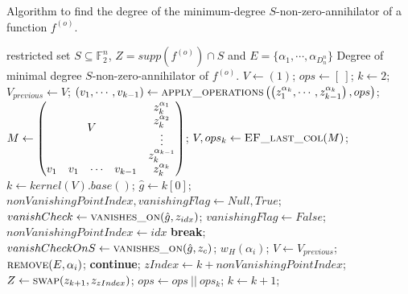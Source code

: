 \documentclass[11pt]{llncs}
\begin{document}
\begin{algorithm}
	\caption{Algorithm to find the degree of the minimum-degree $S$-non-zero-annihilator of a function $f^{(o)}$.}\label{alg:MinDegreeSnonZeroAnnihilatorIterative}
	\begin{algorithmic}[1]
		\Require restricted set $S\subseteq \mathbb{F}_2^n$, $Z = supp\left(f^{(o)}\right) \cap S$ and $E = \{\alpha_1, \cdots, \alpha_{D_n^n}\}$
		\Ensure Degree of minimal degree $S$-non-zero-annihilator of $f^{(o)}$.
		\State $V\gets (1)$;
		\State $ops \gets [\ ]$;
		\State $k \gets 2$;
		\State $V_{previous} \gets V$;
		\State $\left(v_1, \cdots, v_{k-1}\right) \gets \mbox{\textsc{apply\_operations}}\left(\left(z_1^{\alpha_k}, \cdots, z_{k-1}^{\alpha_k}\right), ops\right)$\footnotemark;
		\State  $M \gets \begin{pmatrix}
		\multicolumn{4}{c}{\multirow{4}{*}{$V$}} & z_k^{\alpha_1}\\
		& & & & z_k^{\alpha_2}\\
		& & & & \vdots\\
		& & & & z_k^{\alpha_{k-1}}\\
		v_1 & v_1& \cdots & v_{k-1} & z_k^{\alpha_k}
		\end{pmatrix}$;
		\State $V, ops_k\gets \mbox{\textsc{EF\_last\_col}}(M)$\footnotemark;
		\State $k \gets kernel\left(V\right).base()$;
		\State $\hat{g} \gets k[0]$;
		\State $nonVanishingPointIndex, vanishingFlag \gets Null, True$;
		\State $vanishCheck \gets \mbox{\textsc{vanishes\_on}}(\hat{g}, z_{idx})$\footnotemark;
		\State $vanishingFlag \gets False$;
        \State $nonVanishingPointIndex \gets idx$
		\State \textbf{break};
		\EndIf
        \EndFor
		\State $vanishCheckOnS \gets \mbox{\textsc{vanishes\_on}}(\hat{g}, z_c)$;
		\State \Return $w_H\left(\alpha_i\right)$;
		\EndIf
		\EndFor
		\State $V\gets V_{previous}$;
		\State $\mbox{\textsc{remove}}(E, \alpha_i)$;
		\State \textbf{continue}; 
        \Else
		\State $zIndex \gets k+nonVanishingPointIndex$;
		\State $Z \gets \mbox{\textsc{swap}}(z_{k+1}, z_{zIndex})$\footnotemark;
		\EndIf
        \State $ops\gets ops\ ||\ ops_k$;
		\State $k\gets k+1$;
		\EndIf
		\EndWhile
		\State {}
	\end{algorithmic}
\end{algorithm}
\end{document}
